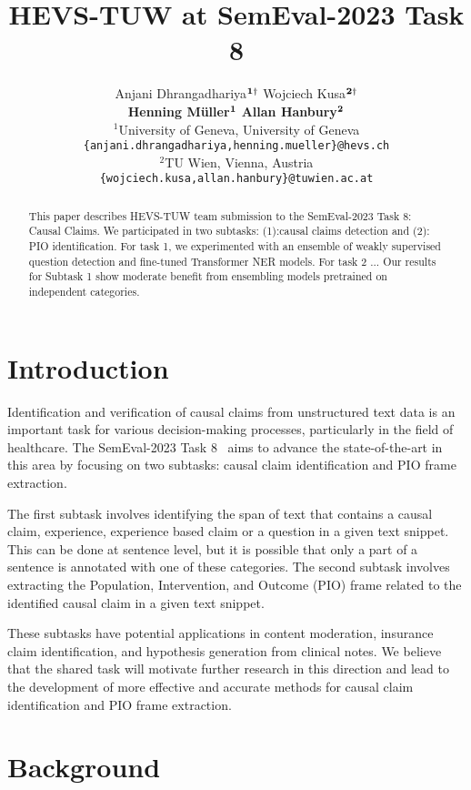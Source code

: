 \documentclass[11pt]{article}
\title{HEVS-TUW at SemEval-2023 Task 8}
\author{Anjani Dhrangadhariya\hspace{1pt}$^{{{\bf 1}}\dag}$ \hspace{.7cm} Wojciech Kusa\hspace{1pt}$^{{\bf 2}\dag}$ \\[0.15cm] {\bf Henning Müller\hspace{1pt}$^{{\bf 1}}$}  \hspace{.7cm}  {\bf Allan Hanbury\hspace{1pt}$^{{\bf 2}}$}
\\[0.4cm]
{$^1$University of Geneva, University of Geneva} \\
{\tt \{anjani.dhrangadhariya,henning.mueller\}@hevs.ch} \\
{$^2$TU Wien, Vienna, Austria} \\
{\tt \{wojciech.kusa,allan.hanbury\}@tuwien.ac.at} \\
}
\begin{document}
\maketitle
{\let\thefootnote\relax{}}

\begin{abstract}
This paper describes HEVS-TUW team submission to the SemEval-2023 Task 8: Causal Claims.
We participated in two subtasks: (1):causal claims detection and (2): PIO identification.
For task 1, we experimented with an ensemble of weakly supervised question detection and fine-tuned Transformer NER models.
For task 2 ...
Our results for Subtask 1 show moderate benefit from ensembling models pretrained on independent categories.

\end{abstract}

\section{Introduction}

Identification and verification of causal claims from unstructured text data is an important task for various decision-making processes, particularly in the field of healthcare. The SemEval-2023 Task 8~\cite{CausalClaims} aims to advance the state-of-the-art in this area by focusing on two subtasks: causal claim identification and PIO frame extraction.

The first subtask involves identifying the span of text that contains a causal claim, experience, experience based claim or a question in a given text snippet. This can be done at sentence level, but it is possible that only a part of a sentence is annotated with one of these categories. The second subtask involves extracting the Population, Intervention, and Outcome (PIO) frame related to the identified causal claim in a given text snippet.

These subtasks have potential applications in content moderation, insurance claim identification, and hypothesis generation from clinical notes. We believe that the shared task will motivate further research in this direction and lead to the development of more effective and accurate methods for causal claim identification and PIO frame extraction.



\section{Background}
\end{document}
